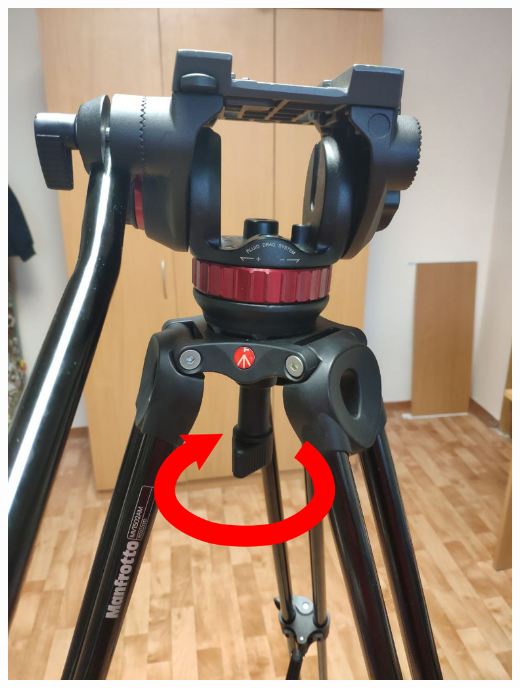 \begin{enumerate}
\begin{enumerate}
\begin{minipage}[c]{0.29\textwidth}
                  \includegraphics[width=\textwidth]{Images/PortableCamera/tripod/step2.4-2-bowl-clamp.jpg}
                \end{minipage}
                \hfill
                \begin{minipage}[c]{0.29\textwidth}
                  \centering

\end{minipage}
\end{enumerate}
\end{enumerate}
